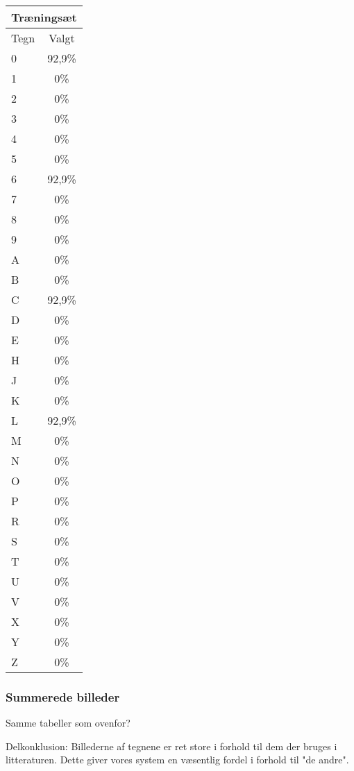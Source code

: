 \begin{tabular}{|l|c|}\hline
\multicolumn{2}{|l|}{Træningsæt} \\\hline
Tegn & Valgt \\\hline
0 & 92,9\% \\\hline
1 & 0\% \\\hline
2 & 0\% \\\hline
3 & 0\% \\\hline
4 & 0\% \\\hline
5 & 0\% \\\hline
6 & 92,9\% \\\hline
7 & 0\% \\\hline
8 & 0\% \\\hline
9 & 0\% \\\hline
A & 0\% \\\hline
B & 0\% \\\hline
C & 92,9\% \\\hline
D & 0\% \\\hline
E & 0\% \\\hline
H & 0\% \\\hline
J & 0\% \\\hline
K & 0\% \\\hline 
L & 92,9\% \\\hline
M & 0\% \\\hline
N & 0\% \\\hline
O & 0\% \\\hline
P & 0\% \\\hline
R & 0\% \\\hline
S & 0\% \\\hline
T & 0\% \\\hline
U & 0\% \\\hline
V & 0\% \\\hline
X & 0\% \\\hline
Y & 0\% \\\hline
Z & 0\% \\\hline \end{tabular}



\subsubsection{Summerede billeder}
Samme tabeller som ovenfor?



Delkonklusion:
Billederne af tegnene er ret store i forhold til dem der bruges i litteraturen. Dette giver vores system en væsentlig fordel i forhold til "de andre".


